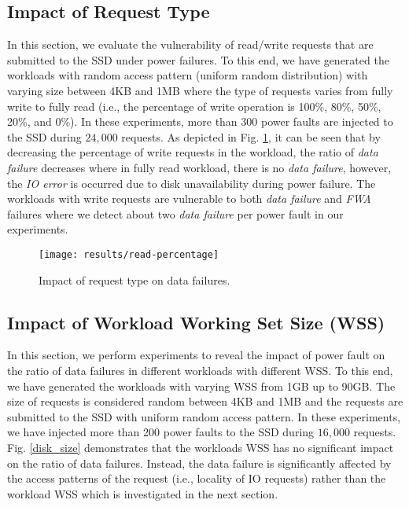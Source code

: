 \vspace{-1em}
\subsection{Impact of Request Type}
\vspace{-0.7em}
\label{sec:req_type}
In this section, we evaluate the vulnerability of read/write requests that are submitted to the SSD under power failures. To this end, we have generated the workloads with random access pattern (uniform random distribution) with varying size between 4KB and 1MB where the type of requests varies from fully write to fully read (i.e., the percentage of write operation is 100\%, 80\%, 50\%, 20\%, and 0\%). In these experiments, more than 300 power faults are injected to the SSD during $24,000$ requests. As depicted in Fig. \ref{read_percentage}, it can be seen that by decreasing the percentage of write requests in the workload, the ratio of \emph{data failure} decreases where in fully read workload, there is no \emph{data failure}, however, the \emph{IO error} is occurred due to disk unavailability during power failure. The workloads with write requests are vulnerable to both \emph{data failure} and \emph{FWA} failures where we detect about two \emph{data failure} per power fault in our experiments.
\begin{figure}[t]
	\centering
	\texttt{[image: results/read-percentage]}
	\vspace{-0.5em}
	\caption{Impact of request type on data failures.}
	\vspace{-2em}
	\label{read_percentage}
\end{figure}

\vspace{-1em}
\subsection{Impact of Workload Working Set Size (WSS)}
\vspace{-0.7em}
\label{sec:disksize}
In this section, we perform experiments to reveal the impact of power fault on the ratio of data failures in different workloads with different WSS.
To this end, we have generated the workloads with varying WSS from 1GB up to 90GB. The size of requests is considered random between 4KB and 1MB and the requests are submitted to the SSD with uniform random access pattern. In these experiments, we have injected more than 200 power faults to the SSD during $16,000$ requests. Fig. \ref{disk_size} demonstrates that the workloads WSS has no significant impact on the ratio of data failures. Instead, the data failure is significantly affected by the access patterns of the request (i.e., locality of IO requests) rather than the workload WSS which is investigated in the next section.

